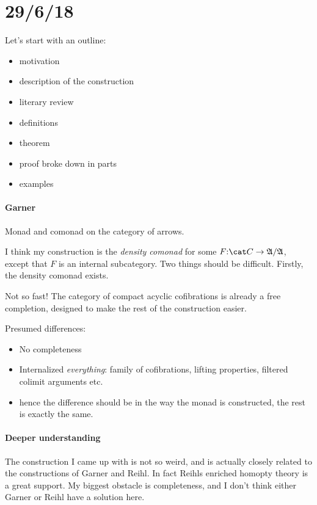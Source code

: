 \documentclass[csh.tex]{subfiles}
\begin{document}
\section{29/6/18}
Let's start with an outline:

\begin{itemize}
\item motivation
\item description of the construction
\item literary review
\item definitions
\item theorem
\item proof broke down in parts
\item examples
\end{itemize}


\paragraph{Garner}
Monad and comonad on the category of arrows.

I think my construction is the \emph{density comonad} for some $F\of \cat C \to \ambient/\ambient$, except that $F$ is an internal subcategory.
Two things should be difficult. Firstly, the density comonad exists.

Not so fast! The category of compact acyclic cofibrations is already a free completion, designed to make the rest of the construction easier.







Presumed differences:
\begin{itemize}
\item No completeness
\item Internalized \emph{everything}: family of cofibrations, lifting properties, filtered colimit arguments etc.
\item hence the difference should be in the way the monad is constructed, the rest is exactly the same.
\end{itemize}


\paragraph{Deeper understanding}
The construction I came up with is not so weird, and is actually closely related to the constructions of Garner and Reihl. In fact Reihls enriched homopty theory is a great support. My biggest obstacle is completeness, and I don't think either Garner or Reihl have a solution here.
\end{document}
